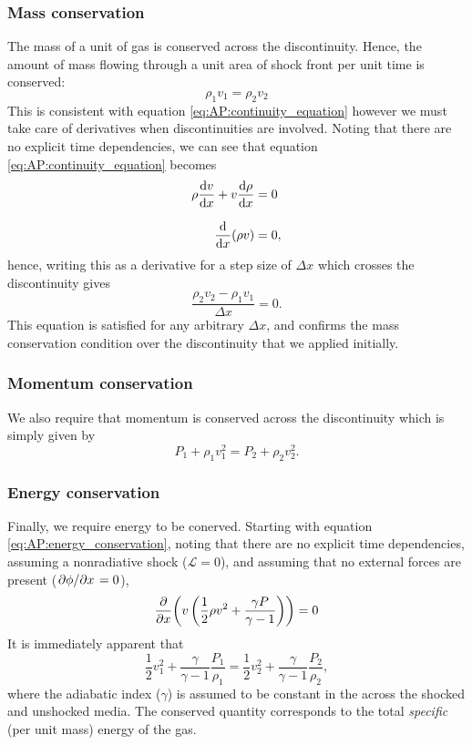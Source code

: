 \subsubsection{Mass conservation}
The mass of a unit of gas is conserved across the discontinuity.
 Hence, the amount of mass flowing through a unit area of shock front per unit time is conserved:
%
\[\rho_1 v_1 = \rho_2 v_2 \]
%
This is consistent with equation \ref{eq:AP:continuity_equation} however we must take care of derivatives when discontinuities are involved.
 Noting that there are no explicit time dependencies, we can see that equation \ref{eq:AP:continuity_equation} becomes
%
\begin{align}
	\rho \dv{v}{x} + v \dv{\rho}{x} &= 0	\nonumber
	\linedrop
	\dv{x}(\rho v) &= 0,					\nonumber
	\label{eq:AP:shock_mass_conservation}
\end{align} 
%
hence, writing this as a derivative for a step size of \(\Delta x\) which crosses the discontinuity gives
%
\begin{equation}
	\frac{\rho_2 v_2 - \rho_1 v_1}{\Delta x} = 0.
\end{equation}
%
This equation is satisfied for any arbitrary \(\Delta x\), and confirms the mass conservation condition over the discontinuity that we applied initially.
%
\subsubsection{Momentum conservation}
We also require that momentum is conserved across the discontinuity which is simply given by
%
\begin{equation}
	P_1 + \rho_1 v_1^2 = P_2 + \rho_2 v_2^2.
	\label{eq:AP:shock_momentum_conservation}
\end{equation}
%
\subsubsection{Energy conservation}
Finally, we require energy to be conerved.
 Starting with equation \ref{eq:AP:energy_conservation}, noting that there are no explicit time dependencies, assuming a nonradiative shock (\(\mathcal{L} = 0\)), and assuming that no external forces are present (\( \pdv*{\phi}{x} = 0 \)),
%
\[ \pdv{x}(v \left(\frac{1}{2} \rho v^2 + \frac{\gamma P}{\gamma - 1}\right)) = 0 \]
%
It is immediately apparent that 
\begin{equation}
	\frac{1}{2} v_1^2 + \frac{\gamma}{\gamma - 1 } \frac{P_1}{\rho_1} = \frac{1}{2} v_2^2 + \frac{\gamma}{\gamma - 1 } \frac{P_2}{\rho_2},
	\label{eq:AP:shock_energy_conservation}
\end{equation}
%
where the adiabatic index (\(\gamma\)) is assumed to be constant in the across the shocked and unshocked media.
 The conserved quantity corresponds to the total \emph{specific} (per unit mass) energy of the gas.
%
